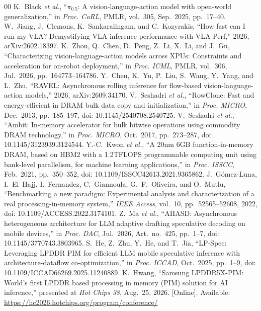 \begin{thebibliography}{00}
 K.~Black \emph{et al.}, ``$\pi_{0.5}$: A vision-language-action model with open-world generalization,'' in \emph{Proc. CoRL}, PMLR, vol.~305, Sep.~2025, pp.~17--40.
 W.~Jiang, J.~Clemons, K.~Sankaralingam, and C.~Kozyrakis, ``How fast can I run my VLA? Demystifying VLA inference performance with VLA-Perf,'' 2026, arXiv:2602.18397.
 K.~Zhou, Q.~Chen, D.~Peng, Z.~Li, X.~Li, and J.~Gu, ``Characterizing vision-language-action models across XPUs: Constraints and acceleration for on-robot deployment,'' in \emph{Proc. ICML}, PMLR, vol.~306, Jul.~2026, pp.~164773--164786.
 Y.~Chen, K.~Yu, P.~Liu, S.~Wang, Y.~Yang, and L.~Zhu, ``RAVEL: Asynchronous rolling inference for flow-based vision-language-action models,'' 2026, arXiv:2609.34170.
 V.~Seshadri \emph{et al.}, ``RowClone: Fast and energy-efficient in-DRAM bulk data copy and initialization,'' in \emph{Proc. MICRO}, Dec.~2013, pp.~185--197, doi: 10.1145/2540708.2540725.
 V.~Seshadri \emph{et al.}, ``Ambit: In-memory accelerator for bulk bitwise operations using commodity DRAM technology,'' in \emph{Proc. MICRO}, Oct.~2017, pp.~273--287, doi: 10.1145/3123939.3124544.
 Y.-C.~Kwon \emph{et al.}, ``A 20nm 6GB function-in-memory DRAM, based on HBM2 with a 1.2TFLOPS programmable computing unit using bank-level parallelism, for machine learning applications,'' in \emph{Proc. ISSCC}, Feb.~2021, pp.~350--352, doi: 10.1109/ISSCC42613.2021.9365862.
 J.~G\'omez-Luna, I.~El~Hajj, I.~Fernandez, C.~Giannoula, G.~F.~Oliveira, and O.~Mutlu, ``Benchmarking a new paradigm: Experimental analysis and characterization of a real processing-in-memory system,'' \emph{IEEE Access}, vol.~10, pp.~52565--52608, 2022, doi: 10.1109/ACCESS.2022.3174101.
 Z.~Ma \emph{et al.}, ``AHASD: Asynchronous heterogeneous architecture for LLM adaptive drafting speculative decoding on mobile devices,'' in \emph{Proc. DAC}, Jul.~2026, Art.~no.~425, pp.~1--7, doi: 10.1145/3770743.3803965.
 S.~He, Z.~Zhu, Y.~He, and T.~Jia, ``LP-Spec: Leveraging LPDDR PIM for efficient LLM mobile speculative inference with architecture-dataflow co-optimization,'' in \emph{Proc. ICCAD}, Oct.~2025, pp.~1--9, doi: 10.1109/ICCAD66269.2025.11240889.
 K.~Hwang, ``Samsung LPDDR5X-PIM: World's first LPDDR based processing in memory (PIM) solution for AI inference,'' presented at \emph{Hot Chips 38}, Aug.~25, 2026. [Online]. Available: \url{https://hc2026.hotchips.org/program/conference/}

\end{thebibliography}
